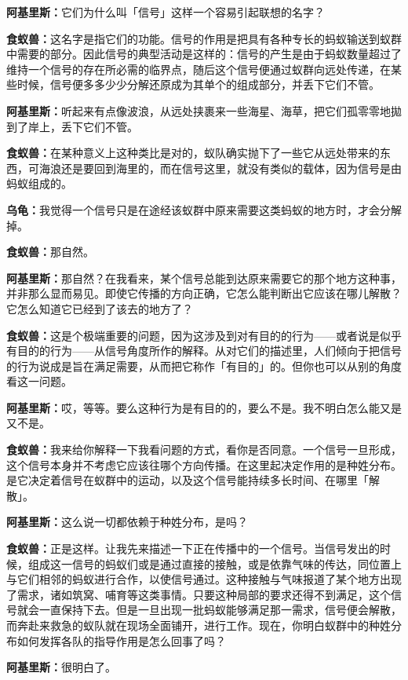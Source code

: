 \documentclass[
  12pt,
  twoside,
  openright,
  oldfontcommands,
]{memoir}
\newcommand{\dialogname}[1]{{\heifamily\bfseries #1}}
\begin{document}
\dialogname{阿基里斯：}它们为什么叫「信号」这样一个容易引起联想的名字？

\dialogname{食蚁兽：}这名字是指它们的功能。信号的作用是把具有各种专长的蚂蚁输送到蚁群中需要的部分。因此信号的典型活动是这样的：信号的产生是由于蚂蚁数量超过了维持一个信号的存在所必需的临界点，随后这个信号便通过蚁群向远处传递，在某些时候，信号便多多少少分解还原成为其单个的组成部分，并丢下它们不管。

\dialogname{阿基里斯：}听起来有点像波浪，从远处挟裹来一些海星、海草，把它们孤零零地拋到了岸上，丢下它们不管。

\dialogname{食蚁兽：}在某种意义上这种类比是对的，蚁队确实抛下了一些它从远处带来的东西，可海浪还是要回到海里的，而在信号这里，就没有类似的载体，因为信号是由蚂蚁组成的。

\dialogname{乌龟：}我觉得一个信号只是在途经该蚁群中原来需要这类蚂蚁的地方时，才会分解掉。

\dialogname{食蚁兽：}那自然。

\dialogname{阿基里斯：}那自然？在我看来，某个信号总能到达原来需要它的那个地方这种事，并非那么显而易见。即使它传播的方向正确，它怎么能判断出它应该在哪儿解散？它怎么知道它已经到了该去的地方了？

\dialogname{食蚁兽：}这是个极端重要的问题，因为这涉及到对有目的的行为------或者说是似乎有目的的行为------从信号角度所作的解释。从对它们的描述里，人们倾向于把信号的行为说成是旨在满足需要，从而把它称作「有目的」的。但你也可以从别的角度看这一问题。

\dialogname{阿基里斯：}哎，等等。要么这种行为是有目的的，要么不是。我不明白怎么能又是又不是。

\dialogname{食蚁兽：}我来给你解释一下我看问题的方式，看你是否同意。一个信号一旦形成，这个信号本身并不考虑它应该往哪个方向传播。在这里起决定作用的是种姓分布。是它决定着信号在蚁群中的运动，以及这个信号能持续多长时间、在哪里「解散」。

\dialogname{阿基里斯：}这么说一切都依赖于种姓分布，是吗？

\dialogname{食蚁兽：}正是这样。让我先来描述一下正在传播中的一个信号。当信号发出的时候，组成这一信号的蚂蚁们或是通过直接的接触，或是依靠气味的传达，同位置上与它们相邻的蚂蚁进行合作，以使信号通过。这种接触与气味报道了某个地方出现了需求，诸如筑窝、哺育等这类事情。只要这种局部的要求还得不到满足，这个信号就会一直保持下去。但是一旦出现一批蚂蚁能够满足那一需求，信号便会解散，而奔赴来救急的蚁队就在现场全面铺开，进行工作。现在，你明白蚁群中的种姓分布如何发挥各队的指导作用是怎么回事了吗？

\dialogname{阿基里斯：}很明白了。
\end{document}
